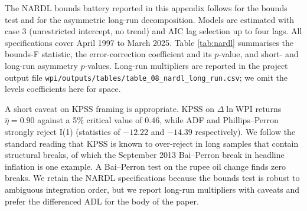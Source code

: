 \documentclass[11pt,a4paper]{article}
\begin{document}
The NARDL bounds battery reported in this appendix follows \citet{pesaran2001} for the bounds test and \citet{shin2014} for the asymmetric long-run decomposition. Models are estimated with case 3 (unrestricted intercept, no trend) and AIC lag selection up to four lags. All specifications cover April 1997 to March 2025. Table \ref{tab:nardl} summarises the bounds-F statistic, the error-correction coefficient and its $p$-value, and short- and long-run asymmetry $p$-values. Long-run multipliers are reported in the project output file \texttt{wpi/outputs/tables/table\_08\_nardl\_long\_run.csv}; we omit the levels coefficients here for space.



A short caveat on KPSS framing is appropriate. KPSS on $\Delta \ln \mathrm{WPI}$ returns $\hat\eta = 0.90$ against a 5\% critical value of $0.46$, while ADF and Phillips--Perron strongly reject I(1) (statistics of $-12.22$ and $-14.39$ respectively). We follow the standard reading that KPSS is known to over-reject in long samples that contain structural breaks, of which the September 2013 Bai--Perron break in headline inflation is one example. A Bai--Perron test on the rupee oil change finds zero breaks. We retain the NARDL specifications because the bounds test is robust to ambiguous integration order, but we report long-run multipliers with caveats and prefer the differenced ADL for the body of the paper.
\end{document}
